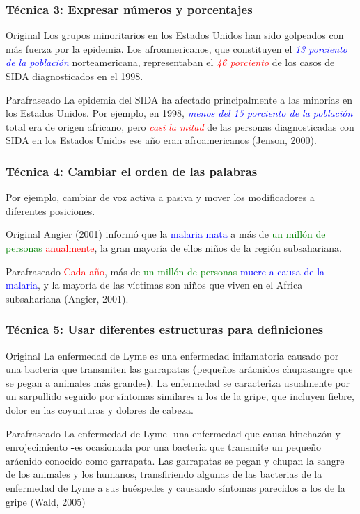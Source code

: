 \documentclass[
11pt, %
]{beamer}
\begin{document}
\begin{frame}
	\frametitle{Técnica 3: Expresar números y porcentajes}
	\begin{block}{Original}
		Los grupos minoritarios en los Estados Unidos han sido golpeados con más fuerza por la epidemia. Los afroamericanos, que constituyen el \textcolor{blue}{\textit{13 porciento de la población}} norteamericana, representaban el \textcolor{red}{\textit{46 porciento}} de los casos de SIDA diagnosticados en el 1998.
	\end{block}
	\begin{block}{Parafraseado}
		La epidemia del SIDA ha afectado principalmente a las minorías en los Estados Unidos. Por ejemplo, en 1998, \textcolor{blue}{\textit{menos del 15 porciento de la población}} total era de origen africano, pero \textcolor{red}{\textit{ casi la mitad}} de las personas diagnosticadas con SIDA en los Estados Unidos ese año eran afroamericanos (Jenson, 2000).
	\end{block}
\end{frame}


\begin{frame}
	\frametitle{Técnica 4: Cambiar el orden de las palabras}
	Por ejemplo, cambiar de voz activa a pasiva y mover los modificadores a diferentes posiciones.
	\begin{block}{Original}
		Angier (2001) informó que la \textcolor{blue}{malaria mata} a más de \textcolor{green}{un millón de personas} \textcolor{red}{anualmente}, la gran mayoría de ellos niños de la región subsahariana.
	\end{block}
	\begin{block}{Parafraseado}
		\textcolor{red}{Cada año}, más de \textcolor{green}{un millón de personas} \textcolor{blue}{muere a causa de la malaria}, y la mayoría de las víctimas son niños que viven en el Africa subsahariana (Angier, 2001).
	\end{block}
\end{frame}


\begin{frame}
	\frametitle{Técnica 5: Usar diferentes estructuras para definiciones}
	\begin{block}{Original}
		La enfermedad de Lyme es una enfermedad inflamatoria causado por una bacteria que transmiten las garrapatas \textbf{(}pequeños arácnidos chupasangre que se pegan a animales más grandes\textbf{)}. La enfermedad se caracteriza usualmente por un sarpullido seguido por síntomas similares a los de la gripe, que incluyen fiebre, dolor en las coyunturas y dolores de cabeza.

	\end{block}
	\begin{block}{Parafraseado}
		La enfermedad de Lyme -una enfermedad que causa hinchazón y enrojecimiento \textbf{-}es ocasionada por una bacteria que transmite un pequeño arácnido conocido como garrapata. Las garrapatas se pegan y chupan la sangre de los animales y los humanos, transfiriendo algunas de las bacterias de la enfermedad de Lyme a sus huéspedes y causando síntomas parecidos a los de la gripe (Wald, 2005)
	\end{block}
\end{frame}
\end{document}
